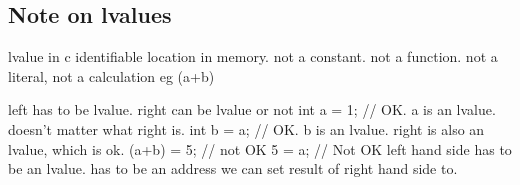 \subsection{Note on lvalues}

lvalue in c
identifiable location in memory. not a constant. not a function. not a literal, not a calculation  eg (a+b)

left has to be lvalue. right can be lvalue or not
int a = 1; // OK. a is an lvalue. doesn't matter what right is.
int b = a; // OK. b is an lvalue. right is also an lvalue, which is ok.
(a+b) = 5; // not OK
5 = a; // Not OK
left hand side has to be an lvalue. has to be an address we can set result of right hand side to.

